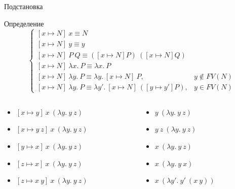     \begin{frame}[fragile]{Подстановка}
        \begin{block}{Определение}
            \begin{equation}
                \nonumber
                \begin{cases}
                [x \mapsto N]
                    ~ x \equiv N \\
                    [x \mapsto N] ~ y \equiv y \\
                    [x \mapsto N] ~ P ~ Q \equiv ([x \mapsto N] P) ~ ([x \mapsto N] Q) \\
                    [x \mapsto N] ~ \lambda x. ~ P \equiv \lambda x. ~ P \\
                    [x \mapsto N] ~ \lambda y. ~ P \equiv \lambda y. ~ [x \mapsto N] ~ P, & y \not\in FV(N) \\
                    [x \mapsto N] ~ \lambda y. ~ P \equiv \lambda y'. ~ [x \mapsto N] ~ ([y \mapsto y'] P), & y \in FV(N)
                \end{cases}
            \end{equation}
        \end{block}
        \vspace{-1em}
        \begin{columns}[onlytextwidth]
            \begin{column}[t]{0.485\textwidth}
                \begin{itemize}
                    \item[\todo] $[x \mapsto y] ~ x ~ (\lambda y. ~ y ~ z)$
                    \item[\todo] $[x \mapsto y ~ z] ~ x ~ (\lambda y. ~ y ~ z)$
                    \item[\todo] $[y \mapsto x] ~ x ~ (\lambda y. ~ y ~ z)$
                    \item[\todo] $[z \mapsto x] ~ x ~ (\lambda y. ~ y ~ z)$
                    \item[\todo] $[z \mapsto x ~ y] ~ x ~ (\lambda y. ~ y ~ z)$
                \end{itemize}
            \end{column}\hfill%
            \begin{column}[t]{0.485\textwidth}
                \begin{itemize}
                    \item[\answer] \pause $y ~ (\lambda y. ~ y ~ z)$
                    \item[\answer] \pause $y ~ z ~ (\lambda y. ~ y ~ z)$
                    \item[\answer] \pause $x ~ (\lambda y. ~ y ~ z)$
                    \item[\answer] \pause $x ~ (\lambda y. ~ y ~ x)$
                    \item[\answer] \pause $x ~ (\lambda y'. ~ y' ~ (x ~ y))$
                \end{itemize}
            \end{column}
        \end{columns}
    \end{frame}

